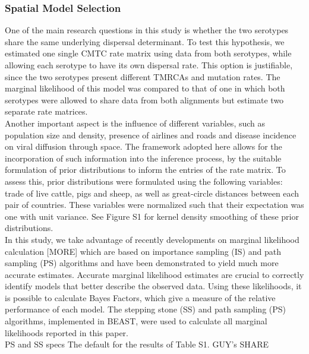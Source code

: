 \documentclass[10pt]{article}
\begin{document}
\subsubsection{Spatial Model Selection}
\indent One of the main research questions in this study is whether the two serotypes share the same underlying dispersal determinant. To test this hypothesis, we estimated one single CMTC rate matrix using data from both serotypes, while allowing each serotype to have its own dispersal rate. This option is justifiable, since the two serotypes present different TMRCAs and mutation rates. The marginal likelihood of this model was compared to that of one in which both serotypes were allowed to share data from both alignments but estimate two separate rate matrices.\\
\indent Another important aspect is the influence of different variables, such as population size and density, presence of airlines and roads and disease incidence on viral diffusion through space. The framework adopted here allows for the incorporation of such information into the inference process, by the suitable formulation of prior distributions to inform the entries of the rate matrix. To assess this, prior distributions were formulated using the following variables: trade of live cattle, pigs and sheep, as well as great-circle distances between each pair of countries. These variables were normalized such that their expectation was one with unit variance. See Figure S1 for kernel density smoothing of these prior distributions.\\
\indent In this study, we take advantage of recently developments on marginal likelihood calculation \cite{Baele2012a}[MORE] which are based on importance sampling (IS) and path sampling (PS) algorithms and have been demonstrated to yield much more accurate estimates. Accurate marginal likelihood estimates are crucial to correctly identify models that better describe the observed data. Using these likelihoods, it is possible to calculate Bayes Factors, which give a measure of the relative performance of each model. The stepping stone (SS) and path sampling (PS) algorithms, implemented in BEAST, were used  to calculate all marginal likelihoods reported in this paper.\\
\indent PS and SS specs The default for the results of Table S1. GUY's SHARE\\
\end{document}
